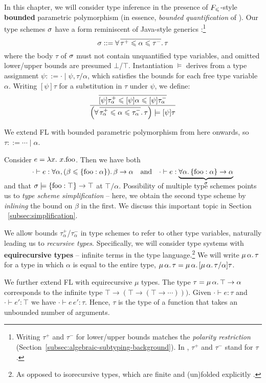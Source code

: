 In this chapter, we will consider type inference in the presence of $F_\leqslant$-style \textbf{bounded} parametric polymorphism (in essence, \emph{bounded quantification} of \textcite{bounded-quantification}). Our type schemes $\sigma$ have a form reminiscent of Java-style generics \cite{generic-java, simple-sub}:\footnote{Writing $\tau^+$ and $\tau^-$ for lower/upper bounds matches the \emph{polarity restriction} (Section~\ref{subsec:algebraic-subtyping-background}). In \inference{}, $\tau^+$ and $\tau^-$ stand for $\tau$.}
$$ \sigma ::= \forall \, \overline{\tau^+ \leqslant \alpha \leqslant \tau^-} \ldotp \tau $$
where the body $\tau$ of $\sigma$ must not contain unquantified type variables, and omitted lower/upper bounds are presumed $\bot$/$\top$. 
Instantiation $\models$ derives from a type assignment $\psi ::= \cdot \mid \psi, \tau/\alpha$, which satisfies the bounds for each free type variable $\alpha$. Writing $[\psi]\tau$ for a substitution in $\tau$ under $\psi$, we define:
$$ \dfrac{\overline{[\psi]\tau_\alpha^+ \sub \substx{\psi} \alpha \sub [\psi]\tau_\alpha^-}}{\left( \forall\, \overline{\tau_\alpha^+ \sub \alpha \sub \tau_\alpha^-} \ldotp \tau \right) \models \substx{\psi}{\tau}} $$
\begin{example}
    We extend FL with bounded parametric polymorphism from here onwards, so $\tau ::= \cdots \mid \alpha$. 

    Consider $e = \lambda {x} \ldotp\, {x}{.}{\mathrm{foo}}$. Then we have both 
    \vspace{-0.5em}
    $$ \cdot \vdash e : \forall \alpha, (\beta \sub \flrec{\mathrm{foo} : \alpha}) \ldotp \beta \to \alpha  \quad \text{and} \quad \cdot \vdash e : \smash{\underbrace{\forall \alpha \ldotp \flrec{\mathrm{foo} : \alpha} \to \alpha}_\sch} $$
    and that $\sch \models \flrec{\mathrm{foo} : \top} \to \top$ at $\top/\alpha$.
    Possibility of multiple type schemes points us to \emph{type scheme simplification} -- here, we obtain the second type scheme by \emph{inlining} the bound on $\beta$ in the first. We discuss this important topic in Section  ~\ref{subsec:simplification}.
\end{example}

We allow bounds $\tau_\alpha^+$/$\tau_\alpha^-$ in type schemes to refer to other type variables, naturally leading us to \emph{recursive types}.
Specifically, we will consider type systems with \textbf{equirecursive types} -- infinite terms in the type language.\footnote{As opposed to isorecursive types, which are finite and (un)folded explicitly \cite{tapl}.} We will write $\mu\,{\alpha}\ldotp \tau$ for a type in which $\alpha$ is equal to the entire type, \ie{} $\mu\,{\alpha}\ldotp  \tau = \mu\,{\alpha}\ldotp [\mu\,{\alpha}\ldotp \tau/\alpha] \tau$.
\begin{example}
    We further extend FL with equirecursive $\mu$ types. 
    The type $\tau = \mu\,{\alpha}\ldotp \top \to \alpha$ corresponds to the infinite type $\top \to (\top \to (\top \to \cdots)))$. Given $\cdot \vdash e : \tau$ and $\cdot \vdash e' : \top$ we have $\cdot \vdash e\,e' : \tau$. Hence, $\tau$ is the type of a function that takes an unbounded number of arguments.
\end{example}

